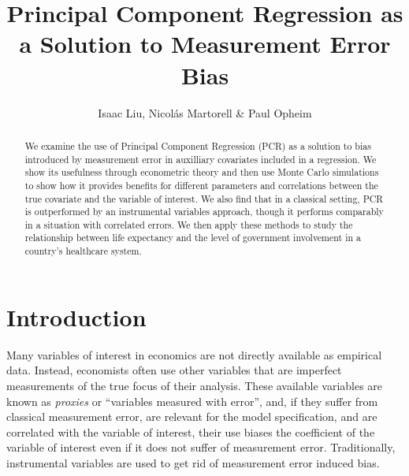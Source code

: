 \documentclass[10pt]{article}
\begin{document}
    \thispagestyle{firststyle}

    \author{Isaac Liu, Nicol\'as Martorell \& Paul Opheim}
    \title{Principal Component Regression as a Solution to Measurement Error Bias} 
    \maketitle



    \begin{abstract}

        We examine the use of Principal Component Regression (PCR) as a solution to bias introduced by measurement error in auxilliary covariates included in a regression. We show its usefulness through econometric theory and then use Monte Carlo simulations to show how it provides benefits for different parameters and correlations between the true covariate and the variable of interest. We also find that in a classical setting, PCR is outperformed by an instrumental variables approach, though it performs comparably in a situation with correlated errors. We then apply these methods to study the relationship between life expectancy and the level of government involvement in a country's healthcare system.
        
    \end{abstract}

    \newpage \clearpage

    \section*{Introduction}

        Many variables of interest in economics are not directly available as empirical data. Instead, economists often use other variables that are imperfect measurements of the true focus of their analysis. These available variables are known as \textit{proxies} or ``variables measured with error'', and, if they suffer from classical measurement error, are relevant for the model specification, and are correlated with the variable of interest, their use biases the coefficient of the variable of interest even if it does not suffer of measurement error. Traditionally, instrumental variables are used to get rid of measurement error induced bias.
\end{document}
